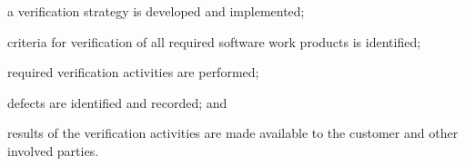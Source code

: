 			\begin{adjustwidth}{2em}{0pt} 

				\begin{compactitem}

					\item a verification strategy is developed and implemented;

					\item criteria for verification of all required software work products is identified;

					\item required verification activities are performed;

					\item defects are identified and recorded; and

					\item results of the verification activities are made available to the customer and other involved parties.

				\end{compactitem}

			\end{adjustwidth}

